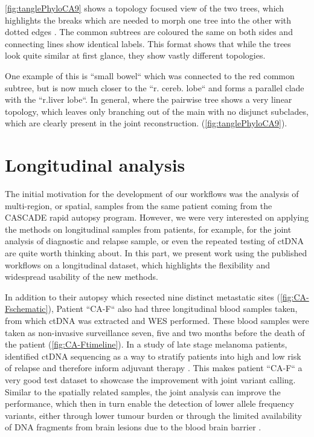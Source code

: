 \autoref{fig:tanglePhyloCA9} shows a topology focused view of the two trees, which highlights the breaks which are needed to morph one tree into the other with dotted edges \cite{Vienne2018}. The common subtrees are coloured the same on both sides and connecting lines show identical labels. This format shows that while the trees look quite similar at first glance, they show vastly different topologies.


One example of this is ``small bowel`` which was connected to the red common subtree, but is now much closer to the ``r. cereb. lobe`` and forms a parallel clade with the ``r.liver lobe``. In general, where the pairwise tree shows a very linear topology, which leaves only branching out of the main with no disjunct subclades, which are clearly present in the joint reconstruction.  (\autoref{fig:tanglePhyloCA9}).


\section[Longitudinal analysis]{Longitudinal analysis}
\label{variantcalling-sec:longitudinal}

The initial motivation for the development of our workflows was the analysis of multi-region, or spatial, samples from the same patient coming from the CASCADE rapid autopsy program. However, we were very interested on applying the methods on longitudinal samples from patients, for example, for the joint analysis of diagnostic and relapse sample, or even the repeated testing of ctDNA are quite worth thinking about. In this part, we present work using the published workflows on a longitudinal dataset, which highlights the flexibility and widespread usability of the new methods.

In addition to their autopsy which resected nine distinct metastatic sites (\autoref{fig:CA-Fschematic}), Patient ``CA-F`` also had three longitudinal blood samples taken, from which ctDNA was extracted and WES performed. These blood samples were taken as non-invasive surveillance seven, five and two months before the death of the patient (\autoref{fig:CA-Ftimeline}). In a study of late stage melanoma patients,  identified ctDNA sequencing as a way to stratify patients into high and low risk of relapse and therefore inform adjuvant therapy \cite{Tan2019}. This makes patient ``CA-F`` a very good test dataset to showcase the improvement with joint variant calling. Similar to the spatially related samples, the joint analysis can improve the performance, which then in turn enable the detection of lower allele frequency variants, either through lower tumour burden or through the limited availability of DNA fragments from brain lesions due to the blood brain barrier \cite{2014}.

